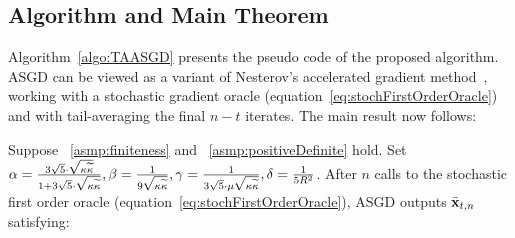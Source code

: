 \subsection{Algorithm and Main Theorem}\label{sec:results}%
Algorithm~\ref{algo:TAASGD} presents the pseudo code of the proposed algorithm. ASGD can be viewed as a variant of Nesterov's accelerated gradient method~\citep{Nesterov12}, working with a stochastic gradient oracle (equation~\ref{eq:stochFirstOrderOracle}) and with tail-averaging the final $n-t$ iterates. The main result now follows:%
\begin{theorem}\label{thm:main}
Suppose ~\ref{asmp:finiteness} and
~\ref{asmp:positiveDefinite} hold. Set $\alpha =
\frac{3\sqrt{5}\cdot\sqrt{{\kappa}\widetilde{\kappa}}}{1+3\sqrt{5}\cdot\sqrt{{\kappa}\widetilde{\kappa}}},
\beta = \frac{1}{9\sqrt{{\kappa}\widetilde{\kappa}}}, \gamma =  \frac{1}{3\sqrt{5}\cdot
  \mu \sqrt{{\kappa}\widetilde{\kappa}}}, \delta = \frac{1}{5R^2}$. After $n$ calls to
the stochastic first order oracle
(equation~\ref{eq:stochFirstOrderOracle}), ASGD
outputs $\bar{\mathbf{x}}_{t,n}$ satisfying:
\vspace{-0.3cm}
\iffalse
	\begin{align*}
	&\E{P(\bar{\x}_{t,n})}-P(\xs) \leq \underbrace{\UC\cdot\frac{(\cnH\cnS)^{9/4}d\cnH}{(n-t)^2}\cdot\exp\bigg(\frac{-t}{9\sqrt{\cnH\cnS}}\bigg)\cdot\big(P(\x_0)-P(\xs)\big)}_{\text{Leading order bias error}}+\underbrace{5\frac{\sigma^2d}{n-t}}_{\text{Leading order variance error}} + \nonumber\\&\underbrace{\UC\cdot(\cnH\cnS)^{5/4}d\cnH\cdot\exp\left(\frac{-n }{9\sqrt{\cnH\cnS}}\right) \big(P(\x_0)-P(\xs)\big)}_{\text{Exponentially vanishing lower order bias term}} + \underbrace{\UC\cdot\frac{\sigma^2 d}{(n-t)^2} \sqrt{\cnH\cnS}}_{\text{Lower order variance error term}}+\nonumber\\ &{\small \underbrace{\UC\cdot\bigg(\sigma^2d\cdot(\cnH\cnS)^{7/4}\cdot\exp\bigg(\frac{-n}{9\sqrt{\cnH\cnS}}\bigg)+\frac{\sigma^2d}{n-t}(\cnH\cnS)^{11/4}\exp\bigg({-\frac{(n-t-1)}{30\sqrt{\cnH\cnS}}}\bigg) +\frac{\sigma^2d}{(n-t)^2}\cdot\exp\bigg({-\frac{n}{9\sqrt{\cnH\cnS}}}\bigg)\cdot(\cnH\cnS)^{7/2}\cnS\bigg)}_{\text{Exponentially vanishing lower order variance error terms}}},%
	\end{align*}
\fi
	\begin{align*}

\end{align*}
\end{theorem}
